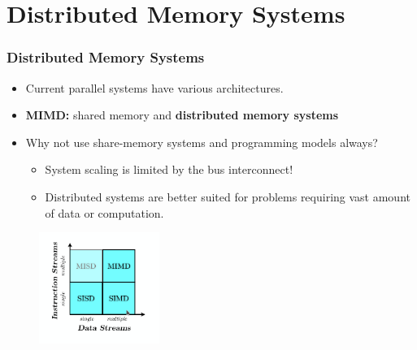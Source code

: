 
\section{Distributed Memory Systems}

\begin{frame}\frametitle{Distributed Memory Systems}



\begin{itemize}
\item Current parallel systems have various architectures.
\item \textbf{MIMD:} shared memory and \textbf{distributed memory systems}
\item Why not use share-memory systems and programming models always? 
\begin{itemize}
\item System scaling is limited by the bus interconnect!
\item Distributed systems are better suited for problems requiring vast amount of data or computation.
\end{itemize}
\end{itemize}

\begin{figure}
\centering
\includegraphics[width=0.35\textwidth]{img/Flynn.png}
\end{figure} 

  
\end{frame}


